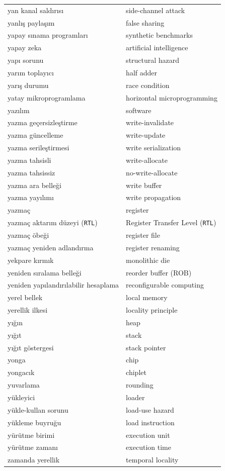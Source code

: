 {\begin{longtable}{@{}p{7.6cm}p{7.6cm}@{}}
yan kanal saldırısı & side-channel attack \\
yanlış paylaşım & false sharing \\
yapay sınama programları & synthetic benchmarks \\
yapay zeka & artificial intelligence \\
yapı sorunu & structural hazard \\
yarım toplayıcı & half adder \\
yarış durumu & race condition \\
yatay mikroprogramlama & horizontal microprogramming \\
yazılım & software \\
yazma geçersizleştirme & write-invalidate \\
yazma güncelleme & write-update \\
yazma serileştirmesi & write serialization \\
yazma tahsisli & write-allocate \\
yazma tahsissiz & no-write-allocate \\
yazma ara belleği & write buffer \\
yazma yayılımı & write propagation \\
yazmaç & register \\
yazmaç aktarım düzeyi (\texttt{RTL}) & Register Transfer Level (\texttt{RTL}) \\
yazmaç öbeği & register file \\
yazmaç yeniden adlandırma & register renaming \\
yekpare kırmık & monolithic die \\
yeniden sıralama belleği & reorder buffer (ROB) \\
yeniden yapılandırılabilir hesaplama & reconfigurable computing \\
yerel bellek & local memory \\
yerellik ilkesi & locality principle \\
yığın & heap \\
yığıt & stack \\
yığıt göstergesi & stack pointer \\
yonga & chip \\
yongacık & chiplet \\
yuvarlama & rounding \\
yükleyici & loader \\
yükle-kullan sorunu & load-use hazard \\
yükleme buyruğu & load instruction \\
yürütme birimi & execution unit \\
yürütme zamanı & execution time \\

zamanda yerellik & temporal locality \\

\end{longtable}
}


